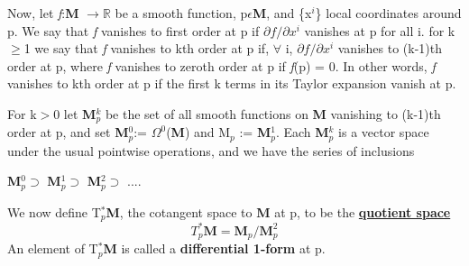 Now, let \textit{f}:\textbf{M} $\rightarrow \mathbb{R}$ be a smooth function, p$\epsilon$\textbf{M}, and \{x$^i$\} local coordinates around
p. We say that \textit{f} vanishes to first order at p if $\partial f /\partial x^i$ vanishes at p for all i.
for k$\geq$1 we say that \textit{f} vanishes to kth order at p if, $\forall$ i, $\partial f /\partial x^i$ vanishes to (k-1)th order at p,
where \textit{f} vanishes to zeroth order at p if \textit{f}(p) = 0. 
In other words, \textit{f} vanishes to kth order at p if the first k terms in its Taylor expansion vanish at p.

For k$>$0 let \textbf{M}$^k_p$ be the set of all smooth functions on \textbf{M} vanishing to (k-1)th order at p, 
and set \textbf{M}$^0_p$:= $\Omega^0$(\textbf{M}) and M$_p$ := \textbf{M}$^1_p$. Each \textbf{M}$^k_p$ is a vector
space under the usual pointwise operations, and we have the series of inclusions

\textbf{M}$^0_p \supset$ \textbf{M}$^1_p \supset$ \textbf{M}$^2_p \supset$ ....

We now define T$_p^*$\textbf{M}, the cotangent space to \textbf{M} at p, to be the
\href{https://www.youtube.com/watch?v=nh-YgZph-r4}{\textbf{quotient space}} 
\begin{equation}
    T_p^*\textbf{M} = \textbf{M}_p/\textbf{M}^2_p
\end{equation}
An element of T$_p^*$\textbf{M} is called a \textbf{differential 1-form} at p.
\newpage
